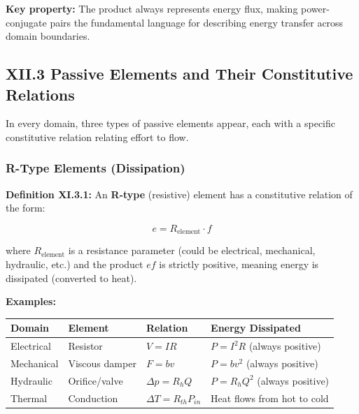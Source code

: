 \documentclass[
]{article}
\begin{document}
\textbf{Key property:} The product always represents energy flux, making
power-conjugate pairs the fundamental language for describing energy
transfer across domain boundaries.

\subsection{XII.3 Passive Elements and Their Constitutive
Relations}\label{xii.3-passive-elements-and-their-constitutive-relations}

In every domain, three types of passive elements appear, each with a
specific constitutive relation relating effort to flow.

\subsubsection{R-Type Elements
(Dissipation)}\label{r-type-elements-dissipation}

\textbf{Definition XI.3.1:} An \textbf{R-type} (resistive) element has a
constitutive relation of the form:

\[e = R_{\text{element}} \cdot f\]

where \(R_{\text{element}}\) is a resistance parameter (could be
electrical, mechanical, hydraulic, etc.) and the product \(ef\) is
strictly positive, meaning energy is dissipated (converted to heat).

\textbf{Examples:}

\begin{longtable}[]{@{}
  >{\raggedright\arraybackslash}p{}
  >{\raggedright\arraybackslash}p{}
  >{\raggedright\arraybackslash}p{}
  >{\raggedright\arraybackslash}p{}@{}}
\toprule\noalign{}
\begin{minipage}[b]{\linewidth}\raggedright
Domain
\end{minipage} & \begin{minipage}[b]{\linewidth}\raggedright
Element
\end{minipage} & \begin{minipage}[b]{\linewidth}\raggedright
Relation
\end{minipage} & \begin{minipage}[b]{\linewidth}\raggedright
Energy Dissipated
\end{minipage} \\
\midrule\noalign{}
\endhead
\bottomrule\noalign{}
\endlastfoot
Electrical & Resistor & \(V = IR\) & \(P = I^2R\) (always positive) \\
Mechanical & Viscous damper & \(F = bv\) & \(P = bv^2\) (always
positive) \\
Hydraulic & Orifice/valve & \(\Delta p = R_h Q\) & \(P = R_h Q^2\)
(always positive) \\
Thermal & Conduction & \(\Delta T = R_{th} P_{in}\) & Heat flows from
hot to cold \\
\end{longtable}
\end{document}
